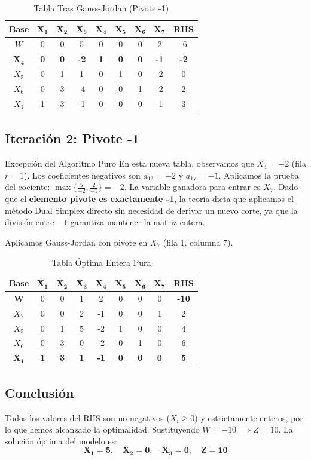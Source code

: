 \documentclass[10pt,a4paper]{article}
\begin{document}
\begin{table}[H]
    \centering
    \begin{tabular}{c c c c c c c c | c}
    \toprule
    \textbf{Base} & $\mathbf{X_1}$ & $\mathbf{X_2}$ & $\mathbf{X_3}$ & $\mathbf{X_4}$ & $\mathbf{X_5}$ & $\mathbf{X_6}$ & $\mathbf{X_7}$ & \textbf{RHS} \\
    \midrule
    $W$   & 0 & 0 & 5 & 0 & 0 & 0 & 2 & -6 \\
    $\mathbf{X_4}$ & \textbf{0} & \textbf{0} & \textbf{-2} & \textbf{1} & \textbf{0} & \textbf{0} & \textbf{-1} & \textbf{-2} \\
    $X_5$ & 0 & 1 & 1 & 0 & 1 & 0 & -2 & 0 \\
    $X_6$ & 0 & 3 & -4 & 0 & 0 & 1 & -2 & 2 \\
    $X_1$ & 1 & 3 & -1 & 0 & 0 & 0 & -1 & 3 \\
    \bottomrule
    \end{tabular}
    \caption{Tabla Tras Gauss-Jordan (Pivote -1)}
\end{table}

\subsection{Iteración 2: Pivote -1}

\begin{nota}{Excepción del Algoritmo Puro}
En esta nueva tabla, observamos que $X_4 = -2$ (fila $r=1$). Los coeficientes negativos son $a_{13} = -2$ y $a_{17} = -1$.
Aplicamos la prueba del cociente: $\max \{ \frac{5}{-2}, \frac{2}{-1} \} = -2$. La variable ganadora para entrar es $X_7$.
Dado que el \textbf{elemento pivote es exactamente -1}, la teoría dicta que aplicamos el método Dual Simplex directo sin necesidad de derivar un nuevo corte, ya que la división entre $-1$ garantiza mantener la matriz entera.
\end{nota}

Aplicamos Gauss-Jordan con pivote en $X_7$ (fila 1, columna 7).

\begin{table}[H]
    \centering
    \begin{tabular}{c c c c c c c c | c}
    \toprule
    \textbf{Base} & $\mathbf{X_1}$ & $\mathbf{X_2}$ & $\mathbf{X_3}$ & $\mathbf{X_4}$ & $\mathbf{X_5}$ & $\mathbf{X_6}$ & $\mathbf{X_7}$ & \textbf{RHS} \\
    \midrule
    $\mathbf{W}$ & 0 & 0 & 1 & 2 & 0 & 0 & 0 & \textbf{-10} \\
    $X_7$ & 0 & 0 & 2 & -1 & 0 & 0 & 1 & 2 \\
    $X_5$ & 0 & 1 & 5 & -2 & 1 & 0 & 0 & 4 \\
    $X_6$ & 0 & 3 & 0 & -2 & 0 & 1 & 0 & 6 \\
    $\mathbf{X_1}$ & \textbf{1} & \textbf{3} & \textbf{1} & \textbf{-1} & \textbf{0} & \textbf{0} & \textbf{0} & \textbf{5} \\
    \bottomrule
    \end{tabular}
    \caption{Tabla Óptima Entera Pura}
\end{table}

\subsection{Conclusión}
Todos los valores del RHS son no negativos ($X_i \geq 0$) y estrictamente enteros, por lo que hemos alcanzado la optimalidad.
Sustituyendo $W = -10 \implies Z = 10$.
La solución óptima del modelo es:
\[ \mathbf{X_1 = 5, \quad X_2 = 0, \quad X_3 = 0, \quad Z = 10} \]
\end{document}
